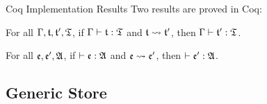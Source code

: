 \begin{frame}{Coq Implementation Results}
    Two results are proved in Coq:
    
    \begin{lemma}[$\t$-Preservation]
    \label{lemma:t-preservation}
    For all $\Gamma, \mathfrak{t}, \mathfrak{t}', \mathfrak{T}$, if $\Gamma \vdash \mathfrak{t} : \mathfrak{T}$ and $\mathfrak{t} \leadsto \mathfrak{t}'$, then $\Gamma \vdash \mathfrak{t}' : \mathfrak{T}$.
    \end{lemma}
    
    \begin{lemma}
    \label{lemma:e-preservation-weak}
    For all $\mathfrak{e}, \mathfrak{e}', \mathfrak{A}$, if $\vdash \mathfrak{e} : \mathfrak{A}$ and $\mathfrak{e} \leadsto \mathfrak{e}'$, then $\vdash \mathfrak{e}' : \mathfrak{A}$.
    \end{lemma}
\end{frame}

\subsection{Generic Store}

